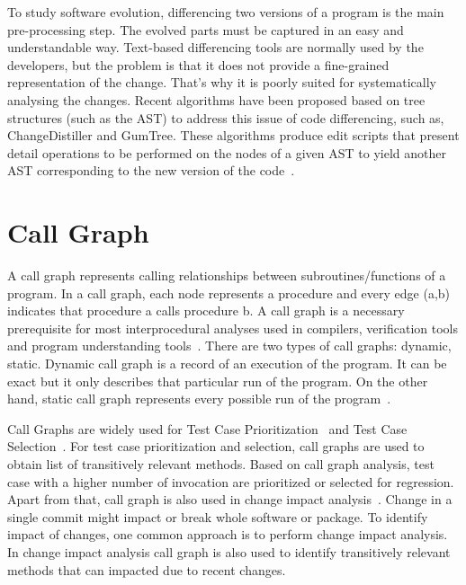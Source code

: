 To study software evolution, differencing two versions of a program is the main pre-processing step. The evolved parts must be captured in an easy and understandable way. Text-based differencing tools are normally used by the developers, but the problem is that it does not provide a fine-grained  representation of the change. That's why it is poorly suited for systematically analysing the changes. Recent algorithms have been
proposed based on tree structures (such as the AST) to address this issue of code differencing, such as, ChangeDistiller and GumTree. These algorithms produce edit scripts that present detail operations to be performed on the nodes of a given AST to yield another AST corresponding to the new version of the code~\cite{Koyuncu, martinez2019}. 

\section{Call Graph}
A call graph represents calling relationships between subroutines/functions of a program. In a call graph, each node represents a procedure and every edge (a,b) indicates that procedure a calls procedure b. A call graph is a necessary prerequisite for most interprocedural analyses used in compilers, verification tools and program understanding tools~\cite{lhotak2007}. There are two types of call graphs: dynamic, static. Dynamic call graph is a record of an execution of the program. It can be exact but it only describes that particular run of the program. On the other hand, static call graph represents every possible run of the program~\cite{wiki:call}.

Call Graphs are widely used for Test Case Prioritization~\cite{luo2016large} and Test Case Selection~\cite{legunsen2016extensive}. For test case prioritization and selection, call graphs are used to obtain list of transitively relevant methods. Based on call graph analysis, test case with a higher number of invocation are prioritized or selected for regression. Apart from that, call graph is also used in change impact analysis~\cite{Musco2017}. Change in a single commit might impact or break whole software or package. To identify impact of changes, one common approach is to perform change impact analysis. In change impact analysis call graph is also used to identify transitively relevant methods that can impacted due to recent changes. 
